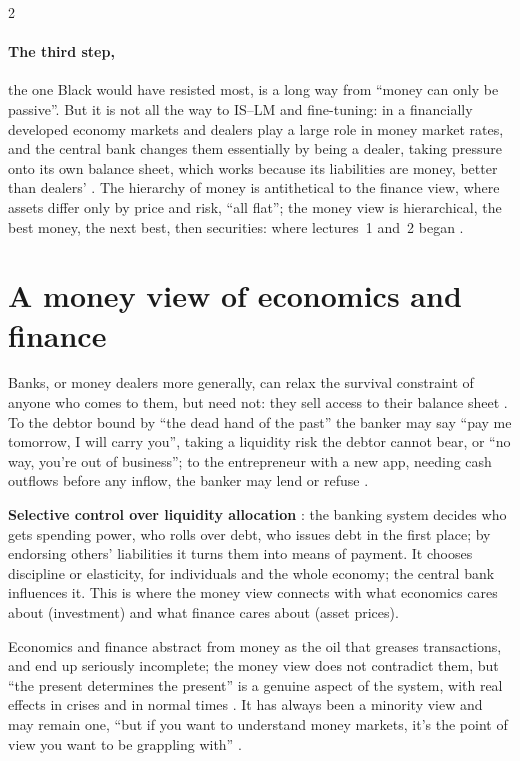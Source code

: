 \begin{paracol}{2}
\paragraph{The third step,} the one Black would have resisted most, is a long way from ``money can only be passive''. But it is not all the way to IS--LM and fine-tuning: in a
financially developed economy markets and dealers play a large role in money market rates, and the central bank changes them essentially by being a dealer, taking pressure onto
its own balance sheet, which works because its liabilities are money, better than dealers' .
The hierarchy of money is antithetical to the finance view, where assets differ only by price and risk, ``all flat''; the money view is hierarchical, the best money, the next
best, then securities: where lectures~1 and~2 began .

\section{A money view of economics and finance}\label{sec:tv-moneyview}

Banks, or money dealers more generally, can relax the survival constraint of anyone who comes to them, but need not: they sell access to their balance sheet
. To the debtor bound by ``the dead hand of the past'' the banker may say ``pay me tomorrow, I will carry you'', taking a liquidity risk the debtor
cannot bear, or ``no way, you're out of business''; to the entrepreneur with a new app, needing cash outflows before any inflow, the banker may lend or refuse
.

\begin{keyformulas}
\textbf{Selective control over liquidity allocation} : the banking system decides who gets spending
power, who rolls over debt, who issues debt in the first place; by endorsing others' liabilities it turns them into means of payment. It chooses discipline or elasticity, for
individuals and the whole economy; the central bank influences it. This is where the money view connects with what economics cares about (investment) and what finance cares
about (asset prices).
\end{keyformulas}

Economics and finance abstract from money as the oil that greases transactions, and end up seriously incomplete; the money view does not contradict them, but ``the present
determines the present'' is a genuine aspect of the system, with real effects in crises and in normal times . It has always been a
minority view and may remain one, ``but if you want to understand money markets, it's the point of view you want to be grappling with'' .


\end{paracol}
